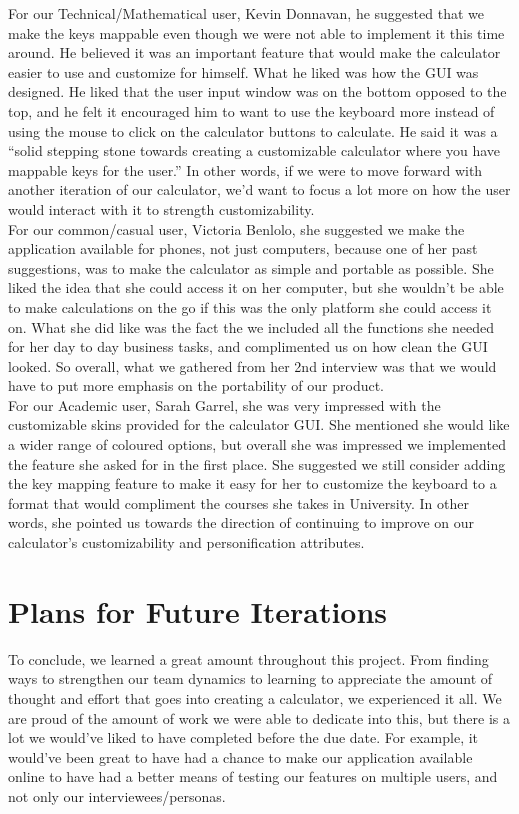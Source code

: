 \documentclass[a4paper, 12pt]{article}
\begin{document}
For our Technical/Mathematical user, Kevin Donnavan, he suggested that we make the keys mappable even though we were not able to implement it this time around. He believed it was an important feature that would make the calculator easier to use and customize for himself. What he liked was how the GUI was designed. He liked that the user input window was on the bottom opposed to the top, and he felt it encouraged him to want to use the keyboard more instead of using the mouse to click on the calculator buttons to calculate. He said it was a “solid stepping stone towards creating a customizable calculator where you have mappable keys for the user.” In other words, if we were to move forward with another iteration of our calculator, we’d want to focus a lot more on how the user would interact with it to strength customizability. 
\\

For our common/casual user, Victoria Benlolo, she suggested we make the application available for phones, not just computers, because one of her past suggestions, was to make the calculator as simple and portable as possible. She liked the idea that she could access it on her computer, but she wouldn’t be able to make calculations on the go if this was the only platform she could access it on. What she did like was the fact the we included all the functions she needed for her day to day business tasks, and complimented us on how clean the GUI looked. So overall, what we gathered from her 2nd interview was that we would have to put more emphasis on the portability of our product. 
\\

For our Academic user, Sarah Garrel, she was very impressed with the customizable skins provided for the calculator GUI. She mentioned she would like a wider range of coloured options, but overall she was impressed we implemented the feature she asked for in the first place. She suggested we still consider adding the key mapping feature to make it easy for her to customize the keyboard to a format that would compliment the courses she takes in University. In other words, she pointed us towards the direction of continuing to improve  on our calculator’s customizability and personification attributes. 


\section{Plans for Future Iterations}

To conclude, we learned a great amount throughout this project. From finding ways to strengthen our team dynamics to learning to appreciate the amount of thought and effort that goes into creating a calculator, we experienced it all. We are proud of the amount of work we were able to dedicate into this, but there is a lot we would’ve liked to have completed before the due date. For example, it would’ve been great to have had a chance to make our application available online to have had a better means of testing our features on multiple users, and not only our interviewees/personas.
\\
\end{document}
